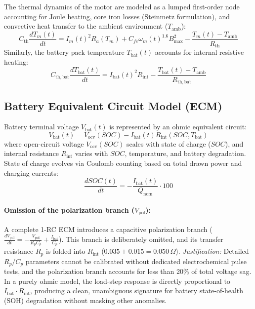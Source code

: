 The thermal dynamics of the motor are modeled as a lumped first-order node accounting for Joule heating, core iron losses (Steinmetz formulation), and convective heat transfer to the ambient environment ($T_{\mathrm{amb}}$):
\begin{equation}
    C_{\mathrm{th}} \frac{dT_m(t)}{dt} = I_m(t)^2 R_a(T_m) + C_{fe} \omega_m(t)^{1.6} B_{\max}^2 - \frac{T_m(t) - T_{\mathrm{amb}}}{R_{\mathrm{th}}}
\end{equation}
Similarly, the battery pack temperature $T_{\mathrm{bat}}(t)$ accounts for internal resistive heating:
\begin{equation}
    C_{\mathrm{th,bat}} \frac{dT_{\mathrm{bat}}(t)}{dt} = I_{\mathrm{bat}}(t)^2 R_{\mathrm{int}} - \frac{T_{\mathrm{bat}}(t) - T_{\mathrm{amb}}}{R_{\mathrm{th,bat}}}
\end{equation}

\subsection{Battery Equivalent Circuit Model (ECM)}

Battery terminal voltage $V_{\mathrm{bat}}(t)$ is represented by an ohmic equivalent circuit:
\begin{equation}
    V_{\mathrm{bat}}(t) = V_{\mathrm{ocv}}(SOC) - I_{\mathrm{bat}}(t) R_{\mathrm{int}}(SOC, T_{\mathrm{bat}})
    \label{eq:battery_ecm}
\end{equation}
where open-circuit voltage $V_{\mathrm{ocv}}(SOC)$ scales with state of charge ($SOC$), and internal resistance $R_{\mathrm{int}}$ varies with $SOC$, temperature, and battery degradation. State of charge evolves via Coulomb counting based on total drawn power and charging currents:
\begin{equation}
    \frac{dSOC(t)}{dt} = -\frac{I_{\mathrm{bat}}(t)}{Q_{\mathrm{nom}}} \cdot 100
\end{equation}

\paragraph{Omission of the polarization branch ($V_{\mathrm{pol}}$):}
A complete 1-RC ECM introduces a capacitive polarization branch ($\frac{dV_{\mathrm{pol}}}{dt} = -\frac{V_{\mathrm{pol}}}{R_p C_p} + \frac{I_{\mathrm{bat}}}{C_p}$). This branch is deliberately omitted, and its transfer resistance $R_p$ is folded into $R_{\mathrm{int}}$ ($0.035 + 0.015 = 0.050\,\Omega$). 
\emph{Justification:} Detailed $R_p/C_p$ parameters cannot be calibrated without dedicated electrochemical pulse tests, and the polarization branch accounts for less than 20\% of total voltage sag. In a purely ohmic model, the load-step response is directly proportional to $I_{\mathrm{bat}} \cdot R_{\mathrm{int}}$, producing a clean, unambiguous signature for battery state-of-health (SOH) degradation without masking other anomalies.

